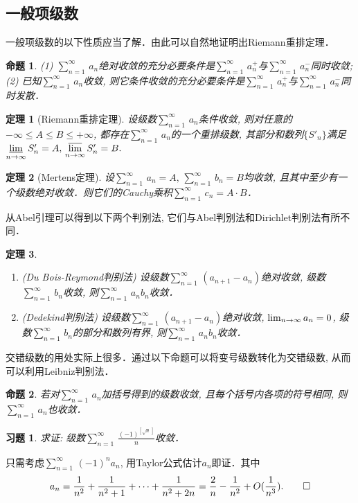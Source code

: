 \documentclass[11pt,a4paper]{ctexart}
\makeatletter
\theoremstyle{thmseries} %
\newtheorem{thm}{定理}[section]
\newtheorem{prop}{命题}[section]
\theoremstyle{exerseries}
\newtheorem{exer}{习题}[section]
\renewenvironment{proof}[1][\proofname]{\par
  \pushQED{\qed}%
  \normalfont \topsep6\p@\@plus6\p@\relax
  \trivlist
  \item[\hskip\labelsep
        \itshape
    #1\@addpunct{}]\ignorespaces
}{%
  \popQED\endtrivlist\@endpefalse
}
\newenvironment{pf}{\begin{proof}[\bfseries\upshape 证\quad]}{\end{proof}}
\def \nti {\mathnormal{n}\to\infty}
\def \tseries {{\textstyle\sum\limits_{n=1}^{\infty}}\,} %
\def \vs {\vspace{-1em}}
\DeclareMathOperator{\llim}{\underset{\nti}{\underline{\lim}}}
\DeclareMathOperator{\ulim}{\underset{\nti}{\overline{\lim}}}
\makeatother
\begin{document}
\subsection{一般项级数}
一般项级数的以下性质应当了解．由此可以自然地证明出Riemann重排定理．
\begin{prop}
	\textnormal{(1)} $\tseries a_n$绝对收敛的充分必要条件是$\tseries a_n^+$与$\tseries a_n^-$同时收敛;
	\textnormal{(2)} 已知$\tseries a_n$收敛, 则它条件收敛的充分必要条件是$\tseries a_n^+$与$\tseries a_n^-$同时发散．
\end{prop}

\begin{thm}[Riemann重排定理]
	设级数$\tseries a_n$条件收敛, 则对任意的$-\infty\leq A\leq B\leq +\infty$, 都存在$\tseries a_n$的一个重排级数, 其部分和数列$\{S'_n\}$满足$\llim S'_n=A,\,\ulim S'_n=B.$
\end{thm}

\begin{thm}[Mertens定理]
	设$\tseries a_n=A,\,\tseries b_n=B$均收敛, 且其中至少有一个级数绝对收敛．则它们的Cauchy乘积$\tseries c_n=A\cdot B$．
\end{thm}

从Abel引理可以得到以下两个判别法, 它们与Abel判别法和Dirichlet判别法有所不同．
\begin{thm}
	\phantom{text}
	\begin{enumerate}
		\item (Du Bois-Reymond判别法) 设级数$\tseries(a_{n+1}-a_n)$绝对收敛, 级数$\tseries b_n$收敛, 则$\tseries a_nb_n$收敛．
		\item (Dedekind判别法) 设级数$\tseries(a_{n+1}-a_n)$绝对收敛, $\lim_{\nti}a_n=0$, 级数$\tseries b_n$的部分和数列有界, 则$\tseries a_nb_n$收敛．
	\end{enumerate}
\end{thm}

交错级数的用处实际上很多．通过以下命题可以将变号级数转化为交错级数, 从而可以利用Leibniz判别法．
\begin{prop}
	若对$\tseries a_n$加括号得到的级数收敛, 且每个括号内各项的符号相同, 则$\tseries a_n$也收敛．
\end{prop}

\begin{exer}
	求证: 级数$\tseries\frac{(-1)^{[\sqrt{n}\,]}}{n}$收敛．
\end{exer}
\begin{pf}
	只需考虑$\tseries(-1)^na_n$, 用Taylor公式估计$a_n$即证．其中\vs
	\[a_n=\frac{1}{n^2}+\frac{1}{n^2+1}+\cdots+\frac{1}{n^2+2n}=\frac{2}{n}-\frac{1}{n^2}+O(\frac{1}{n^3}).\qedhere\]
\end{pf}
\end{document}

